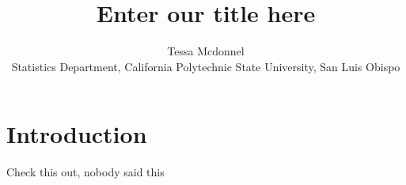 \documentclass[]{tise_style}
\title{Enter our title here}
\author{Tessa Mcdonnel \\Statistics Department, California Polytechnic State University, San Luis Obispo}
\begin{document}
\section{Introduction}

Check this out, nobody said this %

\end{document}
